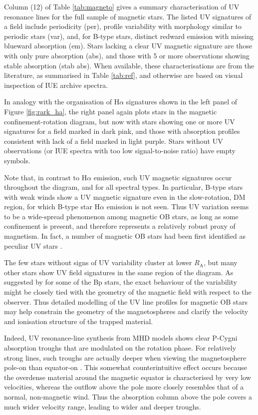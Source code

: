 \documentclass[useAMS,usenatbib]{mn2e}
\newcommand{\ra}{R_\mathrm{A}}
\begin{document}
Column (12) of Table \ref{tab:magneto} gives a summary characterisation of UV resonance lines for the full sample of magnetic stars.
The listed UV signatures of a field include periodicity (per), profile variability with morphology similar to periodic stars (var), and, for B-type stars, distinct redward emission with missing blueward absorption (em).
Stars lacking a clear UV magnetic signature are those with only pure absorption (abs), and those with 5 or more observations showing stable absorption (stab abs).
When available, these characterisations are from the literature, as summarised in Table \ref{tab:ref}, and otherwise are based on visual inspection of IUE archive spectra.


In analogy with the organisation of H$\alpha$ signatures shown in the left panel of Figure \ref{fig:rark_ha}, the right panel again plots stars in the magnetic confinement-rotation diagram, 
but now with stars showing one or more UV signatures for a field marked in dark pink, and those with absorption profiles consistent with lack of a field marked in light purple.
Stars without UV observations (or IUE spectra with too low signal-to-noise ratio) have empty symbols. 

Note that, in contrast to H$\alpha$ emission, such UV magnetic signatures occur throughout the diagram,  and for all spectral types.  In particular,  B-type stars with weak winds  show a UV magnetic signature even in the slow-rotation, DM region, for which B-type star H$\alpha$ emission is not seen.
Thus UV variation seems to be a wide-spread phenomenon among magnetic OB stars, as long as some confinement is present, and therefore represents a relatively robust proxy of magnetism. In fact, a number of magnetic OB stars had been first identified as peculiar UV stars \citep[e.g.][]{1993npsp.conf..186H,2003A&A...406.1019N,henrichs_siglupi}. 

The few stars without signs of UV variability cluster at lower $\ra$, but many other stars show UV field signatures in the same region of the diagram. As suggested by \citet{1990ApJ...365..665S} for some of the Bp stars, the exact behaviour of the variability might be closely tied with the geometry of the magnetic field with respect to the observer. Thus detailed modelling of the UV line profiles for magnetic OB stars may help constrain the geometry of the magnetospheres and clarify the velocity and ionisation structure of the trapped material.

Indeed, UV resonance-line synthesis from MHD models shows clear P-Cygni absorption troughs that are modulated on the rotation phase. 
For relatively strong lines, such troughs are actually deeper when viewing the magnetosphere pole-on than equator-on \citep{2008cihw.conf..125U}. 
This somewhat counterintuitive effect occurs because the overdense material around the magnetic equator is characterised by very low velocities, whereas the outflow above the pole more closely resembles that of a normal, non-magnetic wind. 
Thus the absorption column above the pole covers a much wider velocity range, leading to wider and deeper troughs.
\end{document}
